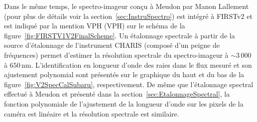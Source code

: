 Dans le même temps, le spectro-imageur conçu à Meudon par Manon Lallement (pour plus de détails voir la section~\ref{sec:InstruSpectro}) est intégré à \ac{FIRSTv2} et est indiqué par la mention \acrshort{VPH} (\acrlong{VPH}) sur le schéma de la figure~\ref{fig:FIRSTV1V2FinalScheme}. Un étalonnage spectrale à partir de la source d'étalonnage de l'instrument \ac{CHARIS} (composé d'un peigne de fréquences) permet d'estimer la résolution spectrale du spectro-imageur à $\sim 3\,000$ à $650 \,$nm. L'identification en longueur d'onde des raies dans le flux mesuré et son ajustement polynomial sont présentés sur le graphique du haut et du bas de la figure~\ref{fig:V2SpecCalSubaru}, respectivement. De même que l'étalonnage spectral effectué à Meudon et présenté dans la section~\ref{sec:EtalonnageSpectral}, la fonction polynomiale de l'ajustement de la longueur d'onde sur les pixels de la caméra est linéaire et la résolution spectrale est similaire.

